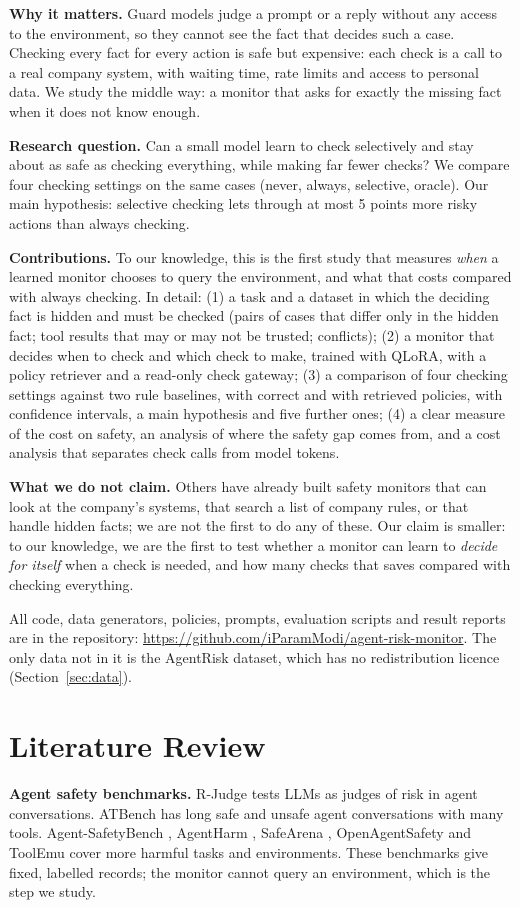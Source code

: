 \documentclass[10pt]{article}
\begin{document}
\textbf{Why it matters.} Guard models judge a prompt or a reply without any access to the environment, so
they cannot see the fact that decides such a case. Checking every fact for every action is safe but
expensive: each check is a call to a real company system, with waiting time, rate limits and access to
personal data. We study the middle way: a monitor that asks for exactly the missing fact when it does not
know enough.

\textbf{Research question.} Can a small model learn to check selectively and stay about as safe as checking
everything, while making far fewer checks? We compare four checking settings on the same cases (never,
always, selective, oracle). Our main hypothesis: selective checking lets through at most 5 points more risky
actions than always checking.

\textbf{Contributions.} To our knowledge, this is the first study that measures \emph{when} a learned monitor
chooses to query the environment, and what that costs compared with always checking. In detail: (1) a task
and a dataset in which the deciding fact is hidden and must be checked (pairs of cases that differ only in
the hidden fact; tool results that may or may not be trusted; conflicts); (2) a monitor that decides when to
check and which check to make, trained with QLoRA, with a policy retriever and a read-only check gateway;
(3) a comparison of four checking settings against two rule baselines, with correct and with retrieved
policies, with confidence intervals, a main hypothesis and five further ones; (4) a clear measure of the cost
on safety, an analysis of where the safety gap comes from, and a cost analysis that separates check calls from model tokens.

\textbf{What we do not claim.} Others have already built safety monitors that can look at the company's
systems, that search a list of company rules, or that handle hidden facts; we are not the first to do any of
these. Our claim is smaller: to our knowledge, we are the first to test whether a monitor can learn to \emph{decide for itself}
when a check is needed, and how many checks that saves compared with checking everything.

All code, data generators, policies, prompts, evaluation scripts and result reports are in the repository:
\url{https://github.com/iParamModi/agent-risk-monitor}. The only data not in it is the AgentRisk dataset,
which has no redistribution licence (Section~\ref{sec:data}).

\section{Literature Review}
\textbf{Agent safety benchmarks.} R-Judge \citep{yuan2024rjudge} tests LLMs as judges of risk in agent
conversations. ATBench \citep{li2026atbench} has long safe and unsafe agent conversations with many tools.
Agent-SafetyBench \citep{zhang2024agentsafetybench}, AgentHarm \citep{andriushchenko2025agentharm}, SafeArena
\citep{tur2025safearena}, OpenAgentSafety \citep{vijayvargiya2025openagentsafety} and ToolEmu
\citep{ruan2024toolemu} cover more harmful tasks and environments. These benchmarks give fixed, labelled
records; the monitor cannot query an environment, which is the step we study.
\end{document}
